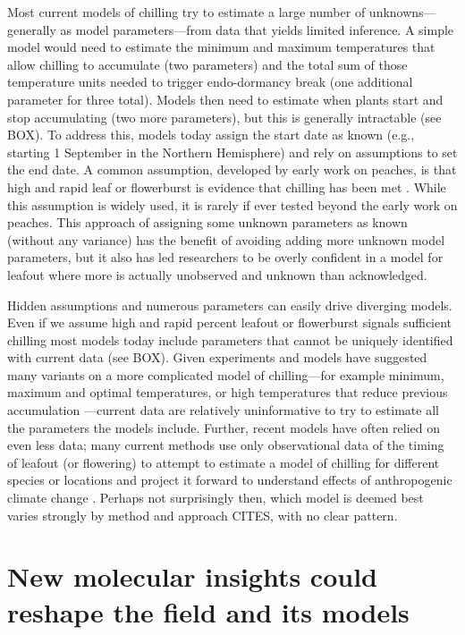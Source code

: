 \documentclass[11pt]{article}
\begin{document}
Most current models of chilling try to estimate a large number of unknowns---generally as model parameters---from data that yields limited inference. A simple model would need to estimate the minimum and maximum temperatures that allow chilling to accumulate (two parameters) and the total sum of those temperature units needed to trigger endo-dormancy break (one additional parameter for three total). Models then need to estimate  when plants start and stop accumulating (two more parameters), but this is generally intractable (see BOX). To address this, models today assign the start date as known (e.g., starting 1 September in the Northern Hemisphere) and rely on assumptions to set the end date. A common assumption, developed by early work on peaches, is that high and rapid leaf or flowerburst is evidence that chilling has been met \citep{erez1971}. While this assumption is widely used, it is rarely if ever tested beyond the early work on peaches. This approach of assigning some unknown parameters as known (without any variance) has the benefit of avoiding adding more unknown model parameters, but it also has led researchers to be overly confident in a model for leafout where more is actually unobserved and unknown than acknowledged. %

Hidden assumptions and numerous parameters can easily drive diverging models. Even if we assume high and rapid percent leafout or flowerburst signals sufficient chilling most models today include parameters that cannot be uniquely identified with current data (see BOX).  Given experiments and models have suggested many variants on a more complicated model of chilling---for example minimum, maximum and optimal temperatures, or high temperatures that reduce previous accumulation \citep[Fig. \ref{fig:modelsketch}][]{lued2011,luedeling2012chilling,chuine2016}---current data are relatively uninformative to try to estimate all the parameters the models include. Further, recent models have often relied on even less data; many current methods use only observational data of the timing of leafout (or flowering) to attempt to estimate a model of chilling for different species or locations and project it forward to understand effects of anthropogenic climate change \citep{lued2011,luedeling2012chilling,gao2024}. Perhaps not surprisingly then, which model is deemed best varies strongly by method and approach CITES, with no clear pattern. 

\section*{New molecular insights could reshape the field and its models} 
\end{document}

